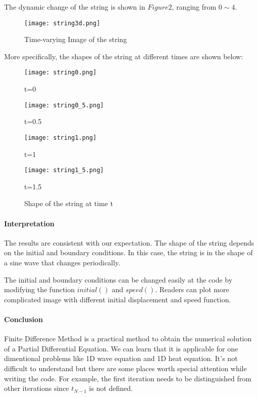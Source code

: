 The dynamic change of the string is shown in $Figure 2$, ranging from $0\sim 4$.

\begin{figure}[htb]
	\centering
	\texttt{[image: string3d.png]}       
	\caption{Time-varying Image of the string}
\end{figure}

More specifically, the shapes of the string at different times are shown below:

\begin{figure}[ht]
	\centering
	\begin{minipage}{8cm}
		\texttt{[image: string0.png]}   
		\caption*{t=0}
		\end{minipage}    
	\begin{minipage}{8cm}
		\texttt{[image: string0\_5.png]}   
		\caption*{t=0.5}
	\end{minipage}  

    \begin{minipage}{8cm}
    	\texttt{[image: string1.png]}   
    	\caption*{t=1}
        \end{minipage}  
    \begin{minipage}{8cm}
    	\texttt{[image: string1\_5.png]}  
    	\caption*{t=1.5} 
    \end{minipage}  
	\caption{Shape of the string at time t}
\end{figure}



\paragraph{Interpretation}

The results are consistent with our expectation. The shape of the string depends on the initial and boundary conditions. In this case, the string is in the shape of a sine wave that changes periodically. 

The initial and boundary conditions can be changed easily at the code by modifying the function $initial()$ and $speed()$. Readers can plot more complicated image with different initial displacement and speed function.

\paragraph{Conclusion}
Finite Difference Method is a practical method to obtain the numerical solution of a Partial Differential Equation. We can learn that it is applicable for one dimentional problems like 1D wave equation and 1D heat equation. It's not difficult to understand but there are some places worth special attention while writing the code. For example, the first iteration needs to be distinguished from other iterations since $t_{N-1}$ is not defined. 

